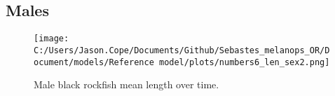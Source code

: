 \documentclass[11pt,
  english,
  letterpaper,
]{article}
\begin{document}
\clearpage

\hypertarget{males-1}{%
\subsection{Males}\label{males-1}}

\begin{figure}
\centering
\texttt{[image: C:/Users/Jason.Cope/Documents/Github/Sebastes\_melanops\_OR/Document/models/Reference model/plots/numbers6\_len\_sex2.png]}
\caption{Male black rockfish mean length over time.\label{fig:num_lts_males}}
\end{figure}

\clearpage
\end{document}
